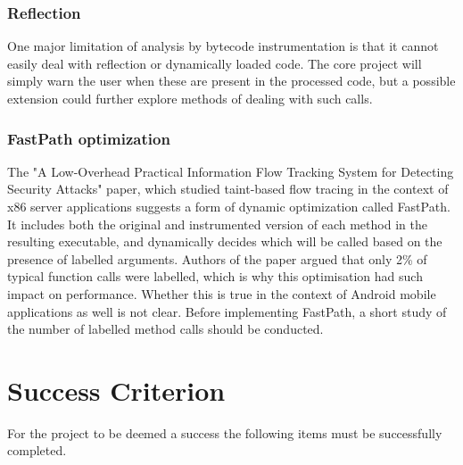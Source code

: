 \documentclass[12pt]{article}
\begin{document}
\subsubsection*{Reflection}

One major limitation of analysis by bytecode instrumentation is that it 
cannot easily deal with reflection or dynamically loaded code. The core
project will simply warn the user when these are present in the processed
code, but a possible extension could further explore methods of dealing 
with such calls.

\subsubsection*{FastPath optimization}

The "A Low-Overhead Practical Information Flow Tracking System for 
Detecting Security Attacks" paper, which studied taint-based flow tracing 
in the context of x86 server applications suggests a form of dynamic 
optimization called FastPath. It includes both the original and 
instrumented version of each method in the resulting executable, and
dynamically decides which will be called based on the presence of labelled 
arguments. Authors of the paper argued that only 2\% of typical 
function calls were labelled, which is why this optimisation had such  
impact on performance. Whether this is true in the context of Android mobile
applications as well is not clear. Before implementing FastPath, a short 
study of the number of labelled method calls should be conducted.

\section*{Success Criterion}

For the project to be deemed a success the following items must be
successfully completed.
\end{document}

